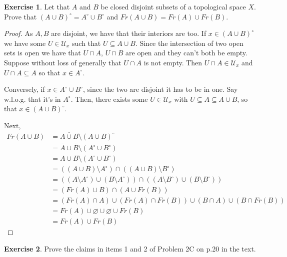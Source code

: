 \documentclass[12pt]{extarticle}
\newcommand{\<}{\langle}
\renewcommand{\>}{\rangle}
\renewcommand{\emptyset}{\varnothing}
\theoremstyle{definition}
\newtheorem{exercise}{Exercise}
\begin{document}
\begin{exercise}
  Let that $A$ and $B$ be closed disjoint subsets of a topological space $X$. Prove that
  $(A \cup B)^\circ = A^\circ \cup B^ \circ$ and $ Fr(A \cup B) = Fr(A) \cup Fr(B)$. 
\end{exercise}
\begin{proof}
  As $A,B$ are disjoint, we have that their interiors are too. If $x \in (A \cup B)^{\circ}$ we have some $U \in \mathcal{U}_x$ such that $U \subseteq A \cup B$.
  Since the intersection of two open sets is open we have that $U \cap A$, $U \cap B$ are open and they can't both be empty. Suppose without loss of generally
  that $U \cap A$ is not empty. Then $U \cap A \in \mathcal{U}_x$ and $U \cap A \subseteq A$ so that $x \in A^{\circ}$.

  Conversely, if $x \in A^{\circ} \cup B^{\circ}$, since the two are disjoint it has to be in one. Say w.l.o.g. that it's in $A^{\circ}$.
  Then, there exists some $U \in \mathcal{U}_x$ with $U \subseteq A \subseteq A \cup B$, so that $x \in (A \cup B)^{\circ}$.

  Next,
  \begin{align*}
    Fr(A \cup B)
    &= \overline{A \cup B} \setminus (A \cup B)^{\circ} \\
    &= \overline{A} \cup \overline{B} \setminus (A^{\circ} \cup B^{\circ}) \\
    &= A \cup B \setminus (A^{\circ} \cup B^{\circ}) \\
    &= ((A \cup B) \setminus A^{\circ}) \cap ((A \cup B) \setminus B^{\circ}) \\
    &= ((A \setminus A^{\circ}) \cup (B \setminus A^{\circ})) \cap ((A \setminus B^{\circ}) \cup (B \setminus B^{\circ})) \\
    &= (Fr(A) \cup B) \cap (A \cup Fr(B)) \\
    &= (Fr(A) \cap A) \cup (Fr(A) \cap Fr(B)) \cup (B \cap A) \cup (B \cap Fr(B)) \\
    &= Fr(A) \cup \emptyset \cup \emptyset \cup Fr(B) \\
    &= Fr(A) \cup Fr(B)
  \end{align*}
\end{proof}

\begin{exercise}
  Prove the claims in items 1 and 2 of Problem 2C on p.20 in the text. 
\end{exercise}
\end{document}
